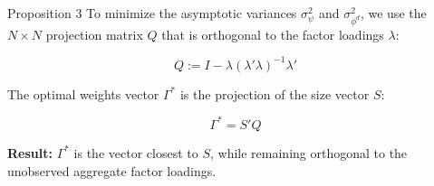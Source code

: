 \documentclass[aspectratio=169,11pt]{beamer}
\begin{document}
\begin{frame}{Proposition 3}
    \vspace{0.5cm}
    \centering
    To minimize the asymptotic variances $\sigma^2_\psi$ and $\sigma^2_{\phi^d}$, we use the $N \times N$ projection matrix $Q$ that is orthogonal to the factor loadings $\lambda$:

    \vspace{0.3cm}
    \begin{equation*}
        Q := I - \lambda(\lambda'\lambda)^{-1}\lambda'
    \end{equation*}

    \vspace{0.5cm}
    The optimal weights vector $\Gamma^*$ is the projection of the size vector $S$:

    \vspace{0.3cm}
    \begin{equation*}
        \Gamma^* = S'Q
    \end{equation*}

    \vspace{0.5cm}
    \textbf{Result:} $\Gamma^*$ is the vector closest to $S$, while remaining orthogonal to the unobserved aggregate factor loadings.
    \vfill
    \hfill \hyperlink{src_propositions}{}
\end{frame}
\end{document}
